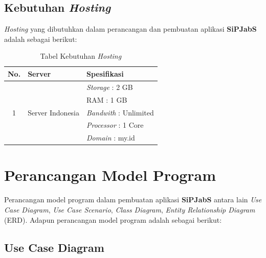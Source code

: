 \subsection{Kebutuhan \textit{Hosting}}

\textit{Hosting} yang dibutuhkan dalam perancangan dan pembuatan aplikasi\textbf{ SiPJabS}
adalah sebagai berikut:

\begin{table}[H]
	\centering
	\caption{Tabel Kebutuhan \textit{Hosting}}
	\begin{tabular}{ | c |  p{54mm} | p{64mm} | }
		\hline
		No. & Server & Spesifikasi \\
		\hline
		\multirow{5}{*}{1} & \multirow{5}{*}{Server Indonesia} & \textit{Storage} : 2 GB \\
		& & RAM : 1 GB \\
		& & \textit{Bandwith} : Unlimited \\
		& & \textit{Processor} : 1 Core \\
		& & \textit{Domain} : my.id  \\
	
		\hline
	\end{tabular}
\end{table}

\section{Perancangan Model Program}
Perancangan model program dalam pembuatan aplikasi \textbf{SiPJabS} antara
lain \textit{Use Case Diagram}, \textit{Use Case Scenario}, \textit{Class Diagram},
\textit{Entity Relationship Diagram} (ERD). Adapun perancangan model program adalah sebagai berikut:

\subsection{Use Case Diagram}

